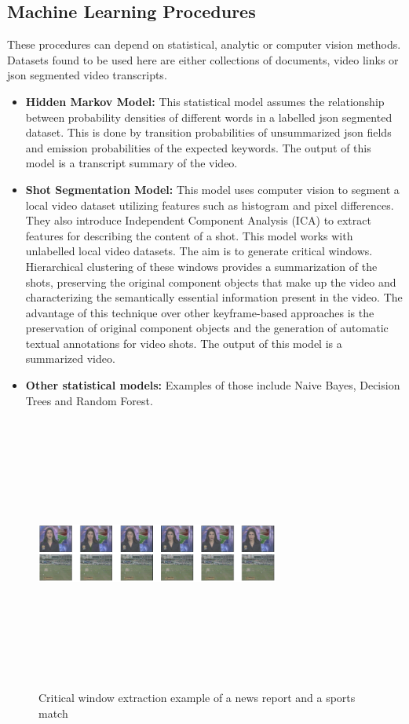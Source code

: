 \documentclass{ieeeaccess}
\begin{document}
\subsection{Machine Learning Procedures}
These procedures can depend on statistical, analytic or computer vision methods. Datasets found to be used here are either collections of documents, video links or json segmented video transcripts\cite{duc}\cite{summe}.
\begin{itemize}
  \item \textbf{Hidden Markov Model: } This statistical model assumes the relationship between probability densities of different words in a labelled json segmented dataset. This is done by transition probabilities of unsummarized json fields and emission probabilities of the expected keywords. The output of this model is a transcript summary of the video.
  \item \textbf{Shot Segmentation Model: } This model\cite{ML1} uses computer vision to segment a local video dataset utilizing features such as histogram and pixel differences. They also introduce Independent Component Analysis (ICA) to extract features for describing the content of a shot. This model works with unlabelled local video datasets. The aim is to generate critical windows.
  Hierarchical clustering of these windows provides a summarization of the shots, preserving the original component objects that make up the video and characterizing the semantically essential information present in the video.
  The advantage of this technique over other keyframe-based approaches is the preservation of original component objects and the generation of automatic textual annotations for video shots. The output of this model is a summarized video. 
  \item \textbf{Other statistical models: } Examples of those include Naive Bayes, Decision Trees and Random Forest.
\end{itemize}

\begin{figure}	[!htb]
    \centering
    \includegraphics[width=8cm, height=9cm, keepaspectratio]{images/ShotsICA.PNG}
    \caption{Critical window extraction example of a news report and a sports match}
    \label{shots_example}
\end{figure}
\end{document}
